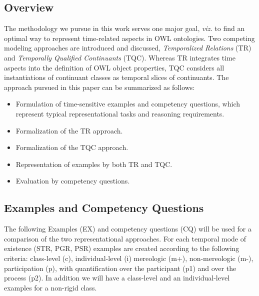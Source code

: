 \subsection*{Overview}
The methodology we pursue in this work serves one major goal, \emph{viz.} to find an optimal way to represent time-related aspects in OWL ontologies. 
Two competing modeling approaches 
are introduced and discussed, \emph{Temporalized Relations} (TR) and \emph{Temporally Qualified Continuants} (TQC). Whereas TR integrates time 
aspects into the definition of OWL object properties, TQC considers all instantiations of continuant classes as temporal slices of continuants. 
The approach pursued in this paper can be summarized as follows:

\begin{itemize}
\item
Formulation of time-sensitive examples and competency questions, which represent typical representational tasks and reasoning requirements. 
\item
Formalization of the TR approach.
\item 
Formalization of the TQC approach.
\item 
Representation of examples by both TR and TQC. 
\item 
Evaluation by competency questions. 

\end{itemize}


\subsection*{Examples and Competency Questions}
 
The following Examples (EX) and competency questions (CQ) will be used for a comparison of the two representational approaches. 
For each temporal mode of existence (STR, PGR, PSR) examples are created according to the following criteria:  
class-level (c), individual-level (i) mereologic (m+), non-mereologic (m-), participation (p), 
with quantification over the participant (p1) and over the process (p2). 
In addition we will have a class-level and an individual-level examples for a non-rigid class. 


